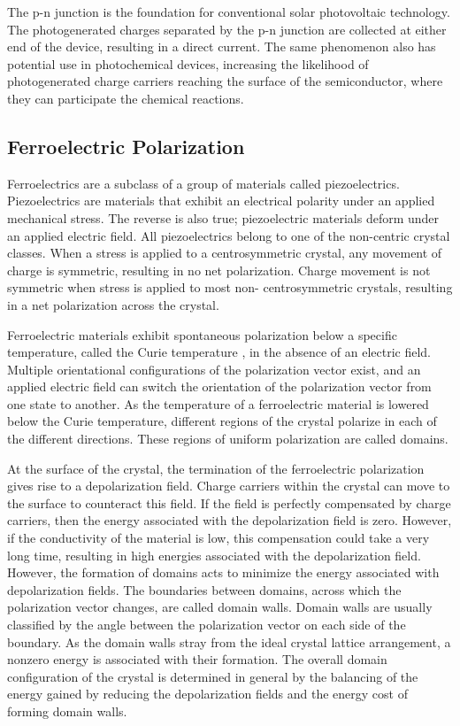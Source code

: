 The p-n junction is the foundation for conventional solar photovoltaic 
technology. The photogenerated charges separated by the p-n junction are 
collected at either end of the device, resulting in a direct current. The 
same phenomenon also has potential use in photochemical devices, increasing 
the likelihood of photogenerated charge carriers reaching the surface of 
the semiconductor, where they can participate the chemical reactions. 


\subsection{Ferroelectric Polarization}
\label{subsec:background.ferroelectric}


Ferroelectrics are a subclass of a group of materials called 
piezoelectrics. Piezoelectrics are materials that exhibit an electrical 
polarity under an applied mechanical stress. The reverse is also true; 
piezoelectric materials deform under an applied electric field. 
\cite{Lines:1977ug} All piezoelectrics belong to one of the non-centric 
crystal classes. When a stress is applied to a centrosymmetric crystal, any 
movement of charge is symmetric, resulting in no net polarization. Charge 
movement is not symmetric when stress is applied to most non-
centrosymmetric crystals, resulting in a net polarization across the 
crystal. \cite{Lines:1977ug}

Ferroelectric materials exhibit spontaneous polarization below a specific 
temperature, called the Curie temperature , in the absence of an 
electric field. \cite{Lines:1977ug} Multiple orientational configurations 
of the polarization vector exist, and an applied electric field can switch 
the orientation of the polarization vector from one state to another.
\cite{Lines:1977ug,Anonymous:7uC1r_sG} As the temperature of a 
ferroelectric material is lowered below the Curie temperature, different 
regions of the crystal polarize in each of the different directions. These 
regions of uniform polarization are called domains.\cite{Lines:1977ug,%
Anonymous:7uC1r_sG,ForsberghJr:1949vl}

At the surface of the crystal, the termination of the ferroelectric 
polarization gives rise to a depolarization field. Charge carriers within 
the crystal can move to the surface to counteract this field. If the field 
is perfectly compensated by charge carriers, then the energy associated 
with the depolarization field is zero. However, if the conductivity of the 
material is low, this compensation could take a very long time, resulting 
in high energies associated with the depolarization field. However, the 
formation of domains acts to minimize the energy associated with 
depolarization fields. The boundaries between domains, across which the 
polarization vector changes, are called domain walls. Domain walls are 
usually classified by the angle between the polarization vector on each 
side of the boundary. As the domain walls stray from the ideal crystal 
lattice arrangement, a nonzero energy is associated with their formation. 
The overall domain configuration of the crystal is determined in general by 
the balancing of the energy gained by reducing the depolarization fields 
and the energy cost of forming domain walls.

